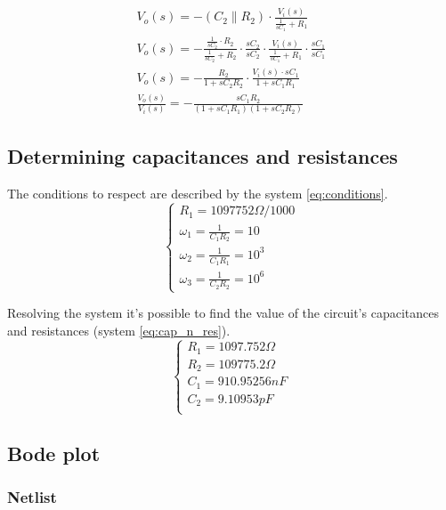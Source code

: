 \documentclass[10pt,a4paper]{article}
\begin{document}
\begin{align}
  V_o(s) = - (C_2 \parallel R_2) \cdot \frac{V_i(s)}{\frac{1}{sC_1}+R_1} \nonumber \\
  V_o(s) = - \frac{\frac{1}{sC_2} \cdot R_2}{\frac{1}{sC_2}+R_2} \cdot \frac{sC_2}{sC_2} \cdot \frac{V_i(s)}{\frac{1}{sC_1}+R_1} \cdot \frac{sC_1}{sC_1} \nonumber \\
  V_o(s) = - \frac{R_2}{1+sC_2R_2} \cdot \frac{V_i(s) \cdot sC_1}{1+sC_1R_1} \nonumber \\
  \frac{V_o(s)}{V_i(s)} = - \frac{sC_1R_2}{(1+sC_1R_1)(1+sC_2R_2)}
\end{align}

\subsection{Determining capacitances and resistances}
The conditions to respect are described by the system \ref{eq:conditions}.
\begin{equation}
  \left\{
  \begin{array}{l}
    R_1 = 1097752\Omega/1000 \\
    \omega_1 = \frac{1}{C_1R_2} = 10 \\
    \omega_2 = \frac{1}{C_1R_1} = 10^3 \\
    \omega_3 = \frac{1}{C_2R_2} = 10^6
  \end{array}
  \right. \label{eq:conditions}
\end{equation}

Resolving the system it's possible to find the value of the circuit's capacitances and resistances (system \ref{eq:cap_n_res}).
\begin{equation}
  \left\{
  \begin{array}{l}
    R_1 = 1097.752\Omega\\
    R_2 = 109775.2\Omega\\
    C_1 = 910.95256nF\\
    C_2 = 9.10953pF\\
  \end{array}
  \right. \label{eq:cap_n_res}
\end{equation}

\subsection{Bode plot}
\subsubsection{Netlist}

\end{document}
